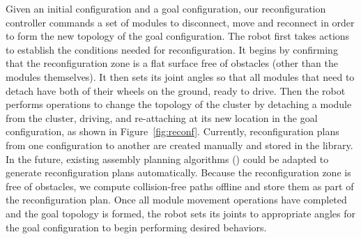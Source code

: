 \documentclass[journal]{IEEEtran}
\begin{document}
Given an initial configuration and a goal configuration, our reconfiguration controller commands a set of modules to disconnect, move and reconnect in order to form the new topology of the goal configuration. 
The robot first takes actions to establish the conditions needed for reconfiguration. 
It begins by confirming that the reconfiguration zone is a flat surface free of obstacles (other than the modules themselves).
It then sets its joint angles so that all modules that need to detach have both of their wheels on the ground, ready to drive.
Then the robot performs operations to change the topology of the cluster by detaching a module from the cluster, driving, and re-attaching at its new location in the goal configuration, as shown in Figure~\ref{fig:reconf}.
Currently, reconfiguration plans from one configuration to another are created manually and stored in the library.  In the future, existing assembly planning algorithms (\cite{Werfel2007,Seo2013}) could be adapted to generate reconfiguration plans automatically.
Because the reconfiguration zone is free of obstacles, we compute collision-free paths offline and store them as part of the reconfiguration plan.
Once all module movement operations have completed and the goal topology is formed, the robot sets its joints to appropriate angles for the goal configuration to begin performing desired behaviors.


\end{document}
